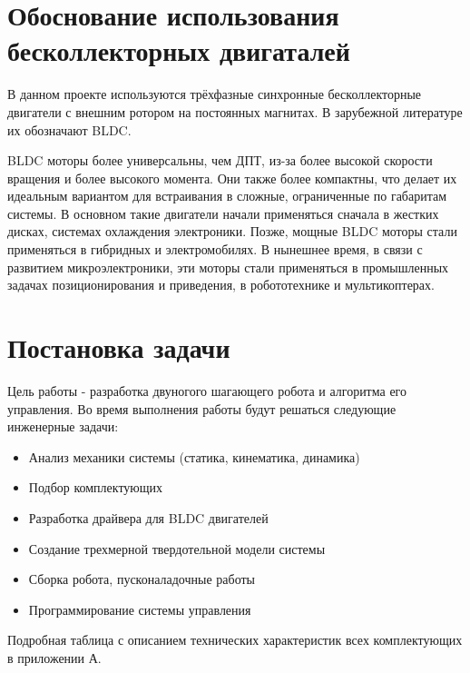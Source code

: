 \section{Обоснование использования бесколлекторных двигаталей}

В данном проекте используются трёхфазные синхронные бесколлекторные двигатели с внешним ротором на постоянных магнитах. В зарубежной литературе их обозначают BLDC.

BLDC моторы более универсальны, чем ДПТ, из-за более высокой скорости вращения и более высокого момента. Они также более компактны, что делает их идеальным вариантом для встраивания в сложные, ограниченные по габаритам системы. В основном такие двигатели начали применяться сначала в жестких дисках, системах охлаждения электроники. Позже, мощные BLDC моторы стали применяться в гибридных и электромобилях. В нынешнее время, в связи с развитием микроэлектроники, эти моторы стали применяться в промышленных задачах позиционирования и приведения, в робототехнике и мультикоптерах.

\section{Постановка задачи}

Цель работы - разработка двуногого шагающего робота и алгоритма его управления. Во время выполнения работы будут решаться следующие инженерные задачи:

\begin{itemize}
    \item Анализ механики системы (статика, кинематика, динамика)
    \item Подбор комплектующих
    \item Разработка драйвера для BLDC двигателей
    \item Создание трехмерной твердотельной модели системы
    \item Сборка робота, пусконаладочные работы
    \item Программирование системы управления
\end{itemize}

Подробная таблица с описанием технических характеристик всех комплектующих в приложении А.